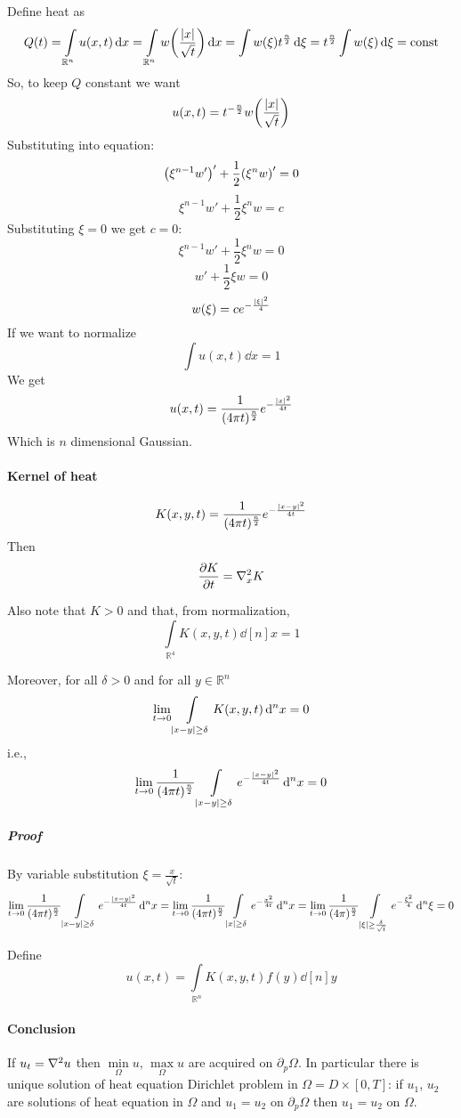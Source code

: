 Define heat as
$$Q(t) = \int\limits_{\mathbb{R}^n} u(x,t) \dd{x} = \int\limits_{\mathbb{R}^n} w\qty(\frac{\abs{x}}{\sqrt{t}}) \dd{x} = \int w(\xi) t^{\frac{n}{2}} \dd{\xi} = t^{\frac{n}{2}} \int w(\xi) \dd{\xi} = \text{const}$$
So, to keep $Q$ constant we want
$$u(x,t) = t^{-\frac{n}{2}} w\qty(\frac{\abs{x}}{\sqrt{t}}) $$
Substituting into equation:
$$\qty(\xi^{n-1}w')' + \frac{1}{2} \qty(\xi^n w)' = 0$$
$$\xi^{n-1}w' + \frac{1}{2} \xi^n w = c$$
Substituting $\xi=0$ we get $c=0$:
$$\xi^{n-1}w' + \frac{1}{2} \xi^n w = 0$$
$$w' + \frac{1}{2} \xi w = 0$$
$$w(\xi) = ce^{-\frac{\abs{\xi}^2}{4}}$$
If we want to normalize
$$\int u(x,t) \dd{x} = 1$$
We get
$$u(x,t) = \frac{1}{(4\pi t)^{\frac{n}{2}}} e^{-\frac{\abs{x}^2}{4t}}$$
Which is $n$ dimensional Gaussian.

\paragraph{Kernel of heat}
$$K(x,y,t) = \frac{1}{(4\pi t)^{\frac{n}{2}}} e^{-\frac{\abs{x-y}^2}{4t}}$$
Then
$$\pdv{K}{t} = \laplacian_x{K}$$

Also note that $K>0$ and that, from normalization,
$$\int\limits_{\mathbb{R}^4} K(x,y,t) \dd[n]{x} = 1$$

Moreover, for all $\delta>0$ and for all $y\in \mathbb{R}^n$ 
$$\lim_{t\to0} \int\limits_{\abs{x-y}\geq \delta} K(x,y,t) \dd[n]{x} = 0$$
i.e.,
$$\lim_{t\to0} \frac{1}{(4\pi t)^{\frac{n}{2}}}\int\limits_{\abs{x-y}\geq \delta} e^{-\frac{\abs{x-y}^2}{4t}} \dd[n]{x} = 0$$
\subparagraph{Proof}
By variable substitution $\xi = \frac{x}{\sqrt{t}}$:
$$\lim_{t\to0} \frac{1}{(4\pi t)^{\frac{n}{2}}}\int\limits_{\abs{x-y}\geq \delta} e^{-\frac{\abs{x-y}^2}{4t}} \dd[n]{x} =\lim_{t\to0} \frac{1}{(4\pi t)^{\frac{n}{2}}}\int\limits_{\abs{x}\geq \delta} e^{-\frac{x^2}{4t}} \dd[n]{x}  =\lim_{t\to0} \frac{1}{(4\pi)^{\frac{n}{2}}}\int\limits_{\abs{\xi}\geq \frac{\delta}{\sqrt{t}}} e^{-\frac{\xi^2}{4}} \dd[n]{\xi}= 0$$



Define
$$u(x,t) = \int\limits_{\mathbb{R}^n} K(x,y,t) f(y) \dd[n]{y}$$
\paragraph{Conclusion}
If $u_t=\laplacian{u}$
then $\min\limits_{ \Omega} u $, $\max\limits_{ \Omega} u $ are acquired on $\partial_p \Omega$. In particular there is unique solution of heat equation Dirichlet problem in $\Omega = D \times [0,T]$:
if $u_1$, $u_2$ are solutions of heat equation in $\Omega$ and $u_1=u_2$ on $\partial_p \Omega$ then $u_1=u_2$ on $\Omega$.
